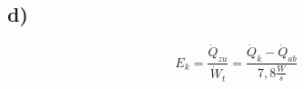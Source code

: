 

\subsection*{d)}

\[
E_k = \frac{\dot{Q}_{zu}}{\dot{W}_t} = \frac{\dot{Q}_{k} - \dot{Q}_{ab}}{7,8 \frac{W}{s}}
\]